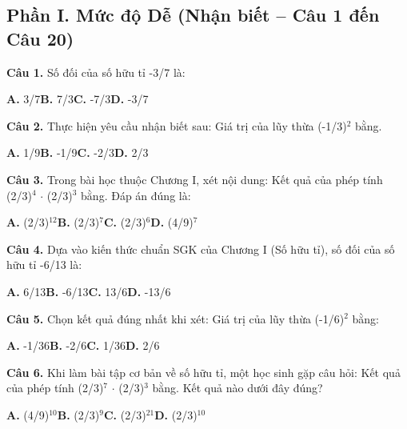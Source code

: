 \documentclass[11pt,a4paper]{article}
\begin{document}
\subsection*{\color{accent} Phần I. Mức độ Dễ (Nhận biết -- Câu 1 đến Câu 20)}
\textbf{\color{primary} Câu 1.} Số đối của số hữu tỉ -3/7 là:\par
\hspace*{1.5em}\textbf{A.} 3/7\quad\quad \textbf{B.} 7/3\quad\quad \textbf{C.} -7/3\quad\quad \textbf{D.} -3/7\par\vspace{2pt}
\textbf{\color{primary} Câu 2.} Thực hiện yêu cầu nhận biết sau: Giá trị của lũy thừa (-1/3)$^2$ bằng.\par
\hspace*{1.5em}\textbf{A.} 1/9\quad\quad \textbf{B.} -1/9\quad\quad \textbf{C.} -2/3\quad\quad \textbf{D.} 2/3\par\vspace{2pt}
\textbf{\color{primary} Câu 3.} Trong bài học thuộc Chương I, xét nội dung: Kết quả của phép tính (2/3)$^{4}$ $\cdot$ (2/3)$^{3}$ bằng. Đáp án đúng là:\par
\hspace*{1.5em}\textbf{A.} (2/3)$^{12}$\quad\quad \textbf{B.} (2/3)$^{7}$\quad\quad \textbf{C.} (2/3)$^{6}$\quad\quad \textbf{D.} (4/9)$^{7}$\par\vspace{2pt}
\textbf{\color{primary} Câu 4.} Dựa vào kiến thức chuẩn SGK của Chương I (Số hữu tỉ), số đối của số hữu tỉ -6/13 là:\par
\hspace*{1.5em}\textbf{A.} 6/13\quad\quad \textbf{B.} -6/13\quad\quad \textbf{C.} 13/6\quad\quad \textbf{D.} -13/6\par\vspace{2pt}
\textbf{\color{primary} Câu 5.} Chọn kết quả đúng nhất khi xét: Giá trị của lũy thừa (-1/6)$^2$ bằng:\par
\hspace*{1.5em}\textbf{A.} -1/36\quad\quad \textbf{B.} -2/6\quad\quad \textbf{C.} 1/36\quad\quad \textbf{D.} 2/6\par\vspace{2pt}
\textbf{\color{primary} Câu 6.} Khi làm bài tập cơ bản về số hữu tỉ, một học sinh gặp câu hỏi: Kết quả của phép tính (2/3)$^{7}$ $\cdot$ (2/3)$^{3}$ bằng. Kết quả nào dưới đây đúng?\par
\hspace*{1.5em}\textbf{A.} (4/9)$^{10}$\quad\quad \textbf{B.} (2/3)$^{9}$\quad\quad \textbf{C.} (2/3)$^{21}$\quad\quad \textbf{D.} (2/3)$^{10}$\par\vspace{2pt}
\end{document}
